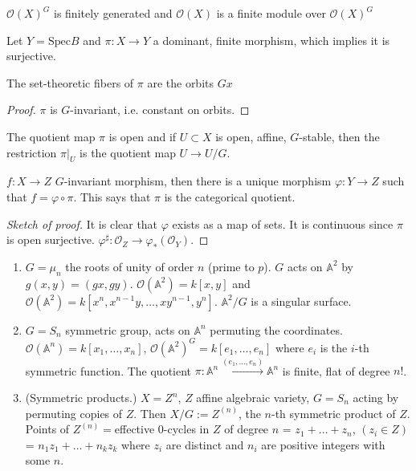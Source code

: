 \begin{proposition}
\label{proposition-1}
$\mathcal{O}(X)^G$ is finitely generated and $\mathcal{O}(X)$ is a finite module
over $\mathcal{O}(X)^G$
\end{proposition}

Let $Y = \text{Spec}B$ and $\pi:X\to Y$ a dominant, finite morphism, which
implies it is surjective.

\begin{proposition}
\label{proposition-2}
The set-theoretic fibers of $\pi$ are the orbits $Gx$
\end{proposition}

\begin{proof}
$\pi$ is $G$-invariant, i.e. constant on orbits.
\end{proof}

\begin{proposition}
\label{proposition-2-second}
The quotient map $\pi$ is open and if $U\subset X$ is open, affine, $G$-stable, 
then the restriction $\pi|_{U}$ is the quotient map $U\to U/G$.
\end{proposition}

\begin{proposition}
\label{proposition-quotient-map-is-categorical-quotient}
$f:X\to Z$ $G$-invariant morphism, then there is a unique morphism $\varphi:Y
\to Z$ such that $f=\varphi \circ\pi$. This says that $\pi$ is the categorical
quotient.
\end{proposition}

\begin{proof}[Sketch of proof]
It is clear that $\varphi$ exists as a map of sets. It is continuous since
$\pi$ is open surjective. $\varphi^\sharp:\mathcal{O}_Z \to
\varphi_*(\mathcal{O}_Y)$.
\end{proof}

\begin{example}
\label{example-quotients}
 \begin{enumerate}
\item $G=\mu_n$ the roots of unity of order $n$ (prime to $p$). $G$ acts on
$\mathbb{A}^2$ by $g(x,y)=(gx,gy)$.  $\mathcal{O}(\mathbb{A}^2)=k[x,y]$ and
$\mathcal{O}(\mathbb{A}^2)=k[x^n,x^{n-1}y,\ldots,xy^{n-1},y^n]$.
$\mathbb{A}^2/G$ is a singular surface.
\item $G=S_n$ symmetric group, acts on $\mathbb{A}^n$ permuting the coordinates.
$\mathcal{O}(\mathbb{A}^n)=k[x_1,\ldots,x_n]$,
$\mathcal{O}(\mathbb{A}^2)^G=k[e_1,\ldots,e_n]$ where $e_i$ is the $i$-th
symmetric function. The quotient
$\pi:\mathbb{A}^n\xrightarrow{(e_1,\ldots,e_n)}\mathbb{A}^n$ is finite, flat of
degree $n!$.
\item (Symmetric products.) $X=Z^n$, $Z$ affine algebraic variety, $G=S_n$
acting by permuting copies of $Z$. Then $X/G:=Z^{(n)}$, the $n$-th symmetric
product of $Z$. Points of $Z^{(n)}=$effective $0$-cycles in $Z$ of degree $n$ =
$z_1+\ldots+z_n$, $(z_i \in Z)$ = $n_1z_1+\ldots+n_kz_k$ where $z_i$ are
distinct and $n_i$ are positive integers with some $n$.
\end{enumerate}
\end{example}

